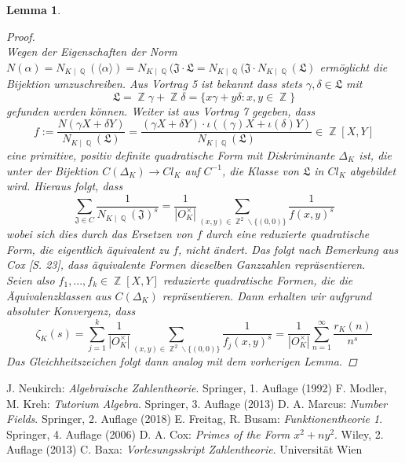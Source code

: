\documentclass[10pt,a4paper]{article}
\theoremstyle{plain}
\newtheorem{lem}[thm]{Lemma}
\theoremstyle{definition}
\theoremstyle{remark}
\DeclareMathOperator{\Q}{\mathbb{Q}}
\DeclareMathOperator{\Z}{\mathbb{Z}}
\begin{document}
\begin{lem}
\begin{proof}
\\
Wegen der Eigenschaften der Norm $N(\alpha)= N_{K\mid \Q}(\langle \alpha \rangle)=N_{K\mid \Q}(\mathfrak{J\cdot L}=N_{K\mid \Q}(\mathfrak{J}\cdot N_{K\mid \Q}(\mathfrak{L})$ ermöglicht die Bijektion umzuschreiben. Aus Vortrag 5 ist bekannt dass stets $\gamma, \delta \in \mathfrak{L}$ mit $$\mathfrak{L}= \Z\gamma+\Z\delta = \{x\gamma+y\delta\colon x,y \in \Z\}$$ gefunden werden können. Weiter ist aus Vortrag 7 gegeben, dass $$f:=\frac{N(\gamma X+\delta Y)}{N_{K\mid \Q}(\mathfrak{L})}=\frac{(\gamma X + \delta Y)\cdot \iota((\gamma)X+\iota(\delta)Y)}{N_{K\mid \Q}(\mathfrak{L})} \in \Z[X,Y]$$eine primitive, positiv definite quadratische Form mit Diskriminante $\Delta_K$ ist, die unter der Bijektion $C(\Delta_K)\rightarrow Cl_K$ auf $C^{-1}$, die Klasse von $\mathfrak{L}$ in $Cl_K$ abgebildet wird. Hieraus folgt, dass $$\sum_{\mathfrak{J}\in C}\frac{1}{N_{K\mid \Q }(\mathfrak{J})^s}=\frac{1}{|O_K^{\times}|}\sum_{(x,y)\in \Z^2\backslash \{ (0,0)\}}\frac{1}{f(x,y)^s}$$wobei sich dies durch das Ersetzen von $f$ durch eine reduzierte quadratische Form, die eigentlich äquivalent zu $f$, nicht ändert. Das folgt nach Bemerkung aus Cox \cite{Cox}[S. 23], dass äquivalente Formen dieselben Ganzzahlen repräsentieren.
\\
Seien also $f_1,...,f_k \in \Z[X,Y]$ reduzierte quadratische Formen, die die Äquivalenzklassen aus $C(\Delta_K)$ repräsentieren. Dann erhalten wir aufgrund absoluter Konvergenz, dass $$\zeta_K(s) = \sum_{j=1}^{k}\frac{1}{|O_K^{\times}|}\sum_{(x,y) \in \Z^2 \backslash \{(0,0)\}}\frac{1}{f_j(x,y)^s}=\frac{1}{|O_K^{\times}|}\sum_{n=1}^{\infty}\frac{r_K(n)}{n^s}$$
Das Gleichheitszeichen folgt dann analog mit dem vorherigen Lemma.
\end{proof}
\end{lem}
 
\begin{thebibliography}{99}
 J. Neukirch: \textit{Algebraische Zahlentheorie}. Springer, 1. Auflage (1992)
 F. Modler, M. Kreh: \textit{Tutorium Algebra}. Springer, 3. Auflage (2013)
 D. A. Marcus: \textit{Number Fields}. Springer, 2. Auflage (2018)
 E. Freitag, R. Busam: \textit{Funktionentheorie 1}. Springer, 4. Auflage (2006)
 D. A. Cox: \textit{Primes of the Form ${x}^2 + n{y}^2$}. Wiley, 2. Auflage (2013)
 C. Baxa: \textit{Vorlesungsskript Zahlentheorie}. Universität Wien
\end{thebibliography}
\end{document}
